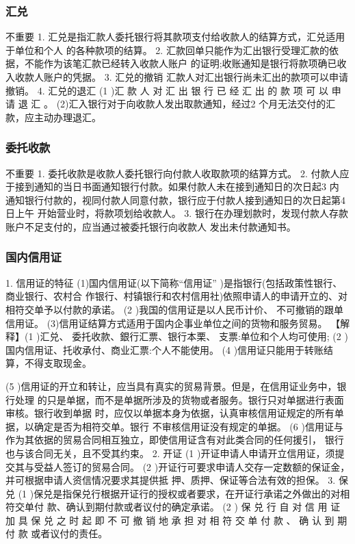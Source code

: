 \documentclass[UTF8,12pt]{ctexart}
\numberwithin{equation}{section} %
\numberwithin{figure}{section}
\numberwithin{table}{section}
\begin{document}
	\subsubsection{汇兑}
	不重要
	1. 汇兑是指汇款人委托银行将其款项支付给收款人的结算方式，汇兑适用于单位和个人
	的各种款项的结算。
	2. 汇款回单只能作为汇出银行受理汇款的依据，不能作为该笔汇款已经转入收款人账户
	的证明;收账通知是银行将款项确已收入收款人账户的凭据。
	3. 汇兑的撤销
	汇款人对汇出银行尚未汇出的款项可以申请撤销。
	4. 汇兑的退汇
	(1 )汇 款 人 对 汇 出 银 行 已 经 汇 出 的 款 项 可 以 申 请 退 汇 。
	(2)汇入银行对于向收款人发出取款通知，经过2 个月无法交付的汇款，应主动办理退汇。
	
	\subsubsection{委托收款} 
	不重要
	1. 委托收款是收款人委托银行向付款人收取款项的结算方式。
	2. 付款人应于接到通知的当日书面通知银行付款。如果付款人未在接到通知日的次日起3
	内 通知银行付款的，视同付款人同意付款，银行应于付款人接到通知日的次日起第4 日上午
	开始营业时，将款项划给收款人。
	3. 银行在办理划款时，发现付款人存款账户不足支付的，应当通过被委托银行向收款人
	发出未付款通知书。
	
	
	\subsubsection{国内信用证} 
	1. 信用证的特征
	(1)国内信用证(以下简称“信用证” )是指银行(包括政策性银行、商业银行、农村合
	作银行、村镇银行和农村信用社)依照申请人的申请开立的、对相符交单予以付款的承诺。
	(2 )我国的信用证是以人民币计价、 不可撤销的跟单信用证。
	(3)信用证结算方式适用于国内企事业单位之间的货物和服务贸易。
	【解释】(1 )汇兑、 委托收款、銀行汇票、银行本栗、 支票:单位和个人均可使用;
	(2 )国内信用证、托收承付、商业汇票:个人不能使用。
	(4 )信用证只能用于转账结算，不得支取现金。
	
	(5 )信用证的开立和转让，应当具有真实的贸易背景。但是，在信用证业务中，银行处理
	的只是单据，而不是单据所涉及的货物或者服务。银行只对单据进行表面审核。银行收到单据
	时，应仅以单据本身为依据，认真审核信用证规定的所有单据，以确定是否为相符交单。银行
	不审核信用证没有规定的单据。
	(6 )信用证与作为其依据的贸易合同相互独立，即使信用证含有对此类合同的任何援引，
	银行也与该合同无关，且不受其约束。
	2. 开证
	(1 )开证申请人申请开立信用证，须提交其与受益人签订的贸易合同。
	(2 )开证行可要求申请人交存一定数额的保证金，并可根据申请人资信情况要求其提供抵
	押、质押、保证等合法有效的担保。
	3. 保兑
	(1 )保兑是指保兑行根据开证行的授权或者要求，在开证行承诺之外做出的对相符交单付
	款、确认到期付款或者议付的确定承诺。
	(2 ) 保 兑 行 自 对 信 用 证 加 具 保 兑 之 时 起 即 不 可 撤 销 地 承 担 对 相 符 交 单 付 款 、 确 认 到 期 付 款
	或者议付的责任。
	
\end{document}
